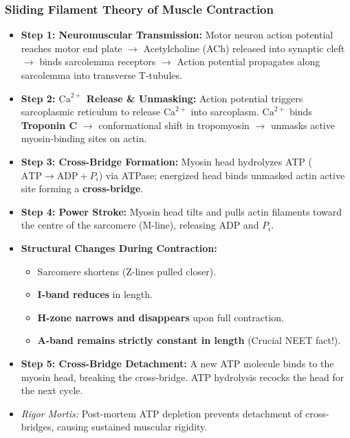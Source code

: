 \documentclass[11pt,a4paper]{article}
\begin{document}
\subsubsection{Sliding Filament Theory of Muscle Contraction}
\begin{itemize}[leftmargin=1.5em, itemsep=3pt]
  \item \textbf{Step 1: Neuromuscular Transmission:} Motor neuron action potential reaches motor end plate $\to$ Acetylcholine (ACh) released into synaptic cleft $\to$ binds sarcolemma receptors $\to$ Action potential propagates along sarcolemma into transverse T-tubules.
  \item \textbf{Step 2: $\text{Ca}^{2+}$ Release \& Unmasking:} Action potential triggers sarcoplasmic reticulum to release $\text{Ca}^{2+}$ into sarcoplasm. $\text{Ca}^{2+}$ binds \textbf{Troponin C} $\to$ conformational shift in tropomyosin $\to$ unmasks active myosin-binding sites on actin.
  \item \textbf{Step 3: Cross-Bridge Formation:} Myosin head hydrolyzes ATP ($\text{ATP} \to \text{ADP} + P_i$) via ATPase; energized head binds unmasked actin active site forming a \textbf{cross-bridge}.
  \item \textbf{Step 4: Power Stroke:} Myosin head tilts and pulls actin filaments toward the centre of the sarcomere (M-line), releasing ADP and $P_i$.
  \item \textbf{Structural Changes During Contraction:}
  \begin{itemize}[label=$\circ$]
    \item Sarcomere shortens (Z-lines pulled closer).
    \item \textbf{I-band reduces} in length.
    \item \textbf{H-zone narrows and disappears} upon full contraction.
    \item \textbf{A-band remains strictly constant in length} (Crucial NEET fact!).
  \end{itemize}
  \item \textbf{Step 5: Cross-Bridge Detachment:} A new ATP molecule binds to the myosin head, breaking the cross-bridge. ATP hydrolysis recocks the head for the next cycle.
  \item \textit{Rigor Mortis:} Post-mortem ATP depletion prevents detachment of cross-bridges, causing sustained muscular rigidity.
\end{itemize}
\end{document}
